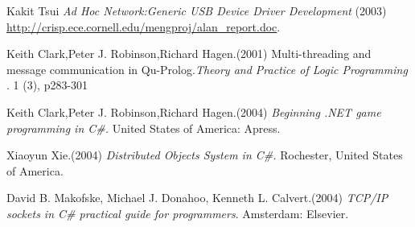 \documentclass[oneside]{ecsgdp}         %
\begin{document}
\begin{thebibliography}{9}
	 Kakit Tsui \emph{Ad Hoc Network:Generic USB Device Driver Development} (2003)
\url{http://crisp.ece.cornell.edu/mengproj/alan_report.doc}.

	 Keith Clark,Peter J. Robinson,Richard Hagen.(2001) Multi-threading and message communication in Qu-Prolog.\textit{Theory and Practice of Logic Programming} . 1 (3), p283-301 
	
		 Keith Clark,Peter J. Robinson,Richard Hagen.(2004) \textit{Beginning .NET game programming in C\#.} United States of America: Apress. 

		 Xiaoyun Xie.(2004) \textit{Distributed Objects System in C\#.} Rochester, United States of America. 

		 David B. Makofske, Michael J. Donahoo, Kenneth L. Calvert.(2004) \textit{TCP/IP sockets in C\#  practical guide for programmers}. Amsterdam: Elsevier.

\end{thebibliography}
\end{document}
